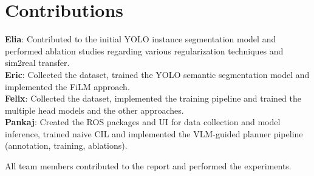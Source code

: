 \section*{Contributions}
\label{appendix:contributions}

\textbf{Elia}: Contributed to the initial YOLO instance segmentation model and performed ablation studies regarding various regularization techniques and sim2real transfer.
\\
\textbf{Eric}: Collected the dataset, trained the YOLO semantic segmentation model and implemented the FiLM approach.
\\
\textbf{Felix}: Collected the dataset, implemented the training pipeline and trained the multiple head models and the other approaches. 
\\
\textbf{Pankaj}: Created the ROS packages and UI for data collection and model inference, trained naive CIL and implemented the VLM-guided planner pipeline (annotation, training, ablations).

All team members contributed to the report and performed the experiments.


